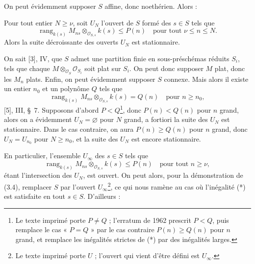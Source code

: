 On peut évidemment supposer $S$ affine, donc noethérien. Alors :

 Pour tout entier $N\geq\nu$, soit $U_N$ l'ouvert de $S$
formé des $s\in S$ tels que
\[
\operatorname{rang}_{k(s)}
M_{ns}\otimes_{\mathcal O_{S,s}}k(s)\leq P(n)
\quad\text{pour tout $\nu\leq n\leq N$}.
\]
Alors la suite décroissante des ouverts $U_N$ est stationnaire.

On sait [3], IV, que $S$ admet une partition finie en sous-préschémas réduits
$S_i$, tels que chaque $M\otimes_{\mathcal O_S}\mathcal O_{S_i}$ soit plat sur
$S_i$. On peut donc supposer $M$ plat, donc les $M_n$ plats. Enfin, on peut
évidemment supposer $S$ connexe. Mais alors il existe un entier $n_0$ et un
polynôme $Q$ tels que
\[
\operatorname{rang}_{k(s)}
M_{ns}\otimes_{\mathcal O_{S,s}}k(s)=Q(n)
\quad\text{pour $n\geq n_0$},
\]
[5], III, \S~7. Supposons d'abord $P<Q$\footnote{Le texte imprimé porte
$P\neq Q$ ; l'erratum de 1962 prescrit $P<Q$, puis remplace le cas « $P=Q$ »
par le cas contraire $P(n)\geq Q(n)$ pour $n$ grand, et remplace les
inégalités strictes de (*) par des inégalités larges.}, donc
$P(n)<Q(n)$ pour $n$ grand, alors on a évidemment $U_N=\varnothing$ pour $N$
grand, a fortiori la suite des $U_N$ est stationnaire. Dans le cas contraire,
on aura $P(n)\geq Q(n)$ pour $n$ grand, donc $U_N=U_{n_0}$ pour $N\geq n_0$,
et la suite des $U_N$ est encore stationnaire.

En particulier, l'ensemble $U_\infty$ des $s\in S$ tels que
\[
\tag{*}
\operatorname{rang}_{k(s)}
M_{ns}\otimes_{\mathcal O_{S,s}}k(s)\leq P(n)
\quad\text{pour tout $n\geq\nu$},
\]
étant l'intersection des $U_N$, est ouvert. On peut alors, pour la démonstration
de (3.4), remplacer $S$ par l'ouvert $U_\infty$\footnote{Le texte imprimé porte $U$ ; l'ouvert qui vient d'être défini est $U_\infty$.}, ce qui nous ramène au cas où
l'inégalité (*) est satisfaite en tout $s\in S$. D'ailleurs :

